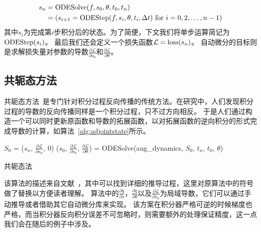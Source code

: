 \documentclass[A4,twoside,UTF8]{ctexart}
\begin{document}
\begin{align}
    \begin{split}
    s_n &= \text{ODESolve}(f, s_0, \theta, t_0, t_n)\\
        &= (s_{i+1} = {\rm ODEStep}(f, s_{i}, \theta, t_i, \Delta t) ~\text{for $i=0,2, \ldots, n-1$})
    \end{split}
\end{align}
其中$s_i$为完成第$i$步积分后的状态。为了简便，下文我们将单步运算简记为${\rm ODEStep}(s_{i})$。
最后我们还会定义一个损失函数$\mathcal{L} = {\rm loss}(s_n)$。
    自动微分的目标则是求解损失量对参数的导数$\frac{\partial \mathcal{L}}{\partial s_0}$和$\frac{\partial \mathcal{L}}{\partial \theta}$。

\subsection{共轭态方法}
    共轭态方法~\cite{Plessix2006,Chen2018}是专门针对积分过程反向传播的传统方法。在研究中，人们发现积分过程的导数的反向传播同样是一个积分过程，只不过方向相反。
    于是人们通过构造一个可以同时更新原函数和导数的拓展函数，以对拓展函数的逆向积分的形式完成导数的计算，如算法~\ref{alg:adjointstate}所示。
\begin{algorithm}
    \SetAlgoLined
    \DontPrintSemicolon
        $S_0$ = ($s_n$, $\frac{\partial \mathcal{L}}{\partial s_n}$, $0$) 
        ($s_0$, $\frac{\partial \mathcal{L}}{\partial s_0}$, $\frac{\partial \mathcal{L}}{\partial \theta}$) = ODESolve(aug\_dynamics, $S_0$, $t_n$, $t_0$, $\theta$) 
    \caption{共轭态法}\label{alg:adjointstate}
\end{algorithm}

该算法的描述来自文献~\cite{Chen2018}，其中可以找到详细的推导过程，这里对原算法中的符号做了替换以方便读者理解。
算法中的$\frac{\partial q}{\partial s}$，$\frac{\partial q}{\partial \theta}$以及$\frac{\partial \mathcal{L}}{\partial s_n}$为局域导数，它们可以通过手动推导或者借助其它自动微分库来实现。
该方案在积分器严格可逆的时候梯度也严格，而当积分器反向积分误差不可忽略时，则需要额外的处理保证精度，这一点我们会在随后的例子中涉及。
\end{document}
